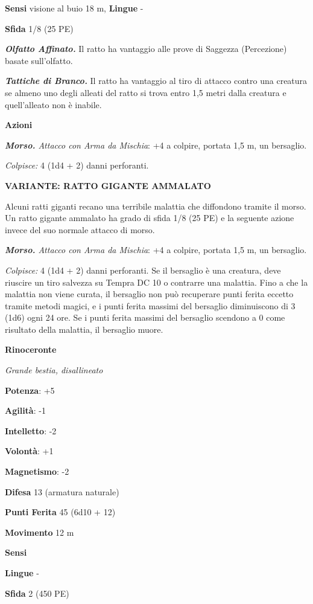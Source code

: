 \begin{multicols}{2}
\textbf{Sensi} visione al buio 18 m, 
\textbf{Lingue} -

\textbf{Sfida} 1/8 (25 PE)

\emph{\textbf{Olfatto Affinato.}} Il ratto ha vantaggio alle prove di
Saggezza (Percezione) basate sull'olfatto.

\emph{\textbf{Tattiche di Branco.}} Il ratto ha vantaggio al tiro di
attacco contro una creatura se almeno uno degli alleati del ratto si
trova entro 1,5 metri dalla creatura e quell'alleato non è inabile.

\textbf{Azioni}

\emph{\textbf{Morso.} Attacco con Arma da Mischia}: +4 a colpire,
portata 1,5 m, un bersaglio.

\emph{Colpisce:} 4 (1d4 + 2) danni perforanti.

\textbf{VARIANTE: RATTO GIGANTE AMMALATO}

Alcuni ratti giganti recano una terribile malattia che diffondono
tramite il morso. Un ratto gigante ammalato ha grado di sfida 1/8 (25
PE) e la seguente azione invece del suo normale attacco di morso.

\emph{\textbf{Morso.} Attacco con Arma da Mischia}: +4 a colpire,
portata 1,5 m, un bersaglio.

\emph{Colpisce:} 4 (1d4 + 2) danni perforanti. Se il bersaglio è una
creatura, deve riuscire un tiro salvezza su Tempra DC 10 o
contrarre una malattia. Fino a che la malattia non viene curata, il
bersaglio non può recuperare punti ferita eccetto tramite metodi magici,
e i punti ferita massimi del bersaglio diminuiscono di 3 (1d6) ogni 24
ore. Se i punti ferita massimi del bersaglio scendono a 0 come risultato
della malattia, il bersaglio muore.

\textbf{Rinoceronte}

\emph{Grande bestia, disallineato}

\textbf{Potenza}: +5

\textbf{Agilità}: -1

\textbf{Intelletto}: -2

\textbf{Volontà}: +1

\textbf{Magnetismo}: -2

\textbf{Difesa} 13 (armatura naturale)

\textbf{Punti Ferita} 45 (6d10 + 12)

\textbf{Movimento} 12 m

\textbf{Sensi} 

\textbf{Lingue} -

\textbf{Sfida} 2 (450 PE)


\end{multicols}
